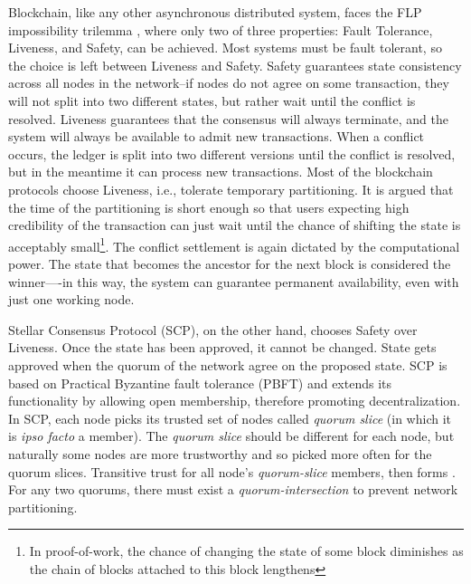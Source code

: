 Blockchain, like any other asynchronous distributed system, faces the FLP impossibility trilemma \cite{fischer1985impossibility}, where only two of three properties: Fault Tolerance, Liveness, and Safety, can be achieved. Most systems must be fault tolerant, so the choice is left between Liveness and Safety. Safety guarantees state consistency across all nodes in the network--if nodes do not agree on some transaction, they will not split into two different states, but rather wait until the conflict is resolved. Liveness guarantees that the consensus will always terminate, and the system will always be available to admit new transactions. When a conflict occurs, the ledger is split into two different versions until the conflict is resolved, but in the meantime it can process new transactions. Most of the blockchain protocols choose Liveness, i.e., tolerate temporary partitioning. It is argued that the time of the partitioning is short enough so that users expecting high credibility of the transaction can just wait until the chance of shifting the state is acceptably small\footnote{In proof-of-work, the chance of changing the state of some block diminishes as the chain of blocks attached to this block lengthens}. The conflict settlement is again dictated by the computational power. The state that becomes the ancestor for the next block is considered the winner—-in this way, the system can guarantee permanent availability, even with just one working node. 

Stellar Consensus Protocol (SCP), on the other hand, chooses Safety over Liveness. Once the state has been approved, it cannot be changed. State gets approved when the quorum of the network agree on the proposed state. 
SCP is based on Practical Byzantine fault tolerance (PBFT) \cite{castro1999practical} and extends its functionality by allowing open membership, therefore promoting decentralization. In SCP, each node picks its trusted set of nodes called \textit{quorum slice} (in which it is \textit{ipso facto} a member). The \textit{quorum slice} should be different for each node, but naturally some nodes are more trustworthy and so picked more often for the quorum slices. Transitive trust for all node's \textit{quorum-slice} members, then forms . For any two quorums, there must exist a \textit{quorum-intersection} to prevent network partitioning.


